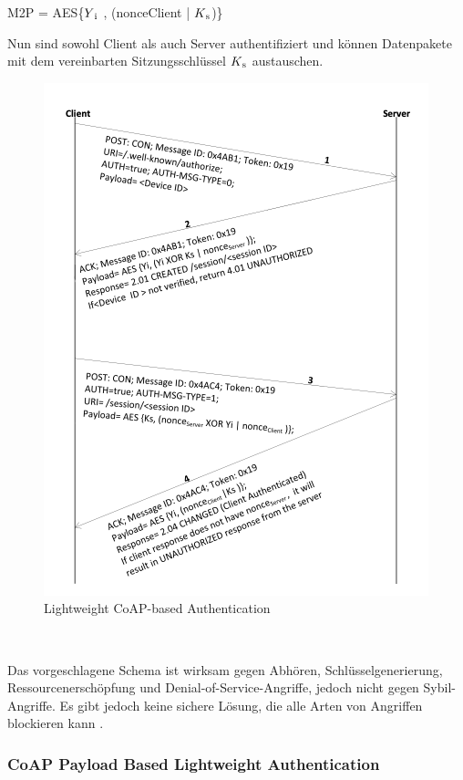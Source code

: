 \begin{enumerate}
M2P = AES\{\(Y\textsubscript{i}\) , (nonceClient | \(K\textsubscript{s}\))\}

 Nun sind sowohl Client als auch Server authentifiziert und können Datenpakete mit dem vereinbarten Sitzungsschlüssel \(K\textsubscript{s}\)  austauschen.

\end{enumerate}

 \begin{figure}[h]
  \centering
  \includegraphics[scale=0.5]{resources/Lightweight CoAP-based Authentication.png}
 \caption{Lightweight CoAP-based Authentication \cite{jan2014robust}}
  \label{fig:CoAP-based-Authentication}
\end{figure}\

Das vorgeschlagene Schema ist wirksam gegen Abhören, Schlüsselgenerierung, Ressourcenerschöpfung und Denial-of-Service-Angriffe, jedoch nicht gegen Sybil-Angriffe. Es gibt jedoch keine sichere Lösung, die alle Arten von Angriffen blockieren kann \cite{jan2014robust}.


\subsubsection{CoAP Payload Based Lightweight Authentication}

